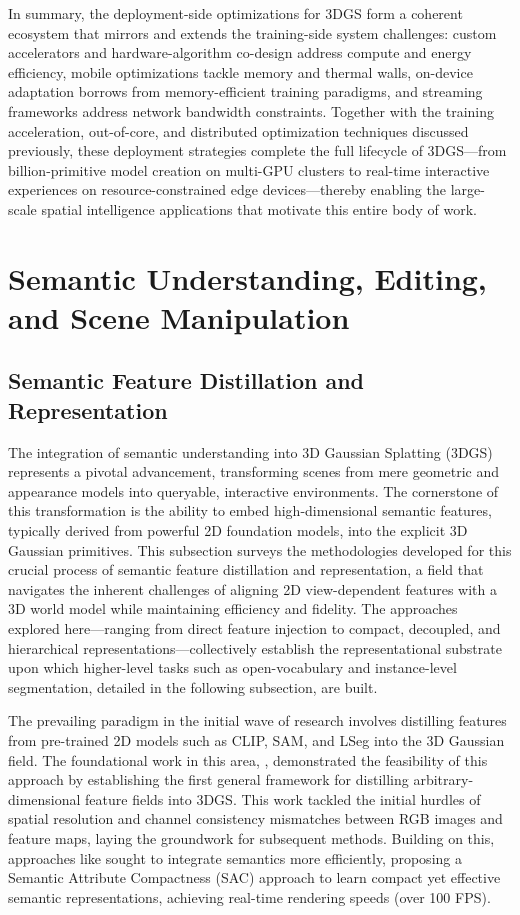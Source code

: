 \documentclass[11pt]{article}
\begin{document}
In summary, the deployment-side optimizations for 3DGS form a coherent ecosystem that mirrors and extends the training-side system challenges: custom accelerators and hardware-algorithm co-design address compute and energy efficiency, mobile optimizations tackle memory and thermal walls, on-device adaptation borrows from memory-efficient training paradigms, and streaming frameworks address network bandwidth constraints. Together with the training acceleration, out-of-core, and distributed optimization techniques discussed previously, these deployment strategies complete the full lifecycle of 3DGS---from billion-primitive model creation on multi-GPU clusters to real-time interactive experiences on resource-constrained edge devices---thereby enabling the large-scale spatial intelligence applications that motivate this entire body of work.

\section{Semantic Understanding, Editing, and Scene Manipulation}

\subsection{Semantic Feature Distillation and Representation}

The integration of semantic understanding into 3D Gaussian Splatting (3DGS) represents a pivotal advancement, transforming scenes from mere geometric and appearance models into queryable, interactive environments. The cornerstone of this transformation is the ability to embed high-dimensional semantic features, typically derived from powerful 2D foundation models, into the explicit 3D Gaussian primitives. This subsection surveys the methodologies developed for this crucial process of semantic feature distillation and representation, a field that navigates the inherent challenges of aligning 2D view-dependent features with a 3D world model while maintaining efficiency and fidelity. The approaches explored here---ranging from direct feature injection to compact, decoupled, and hierarchical representations---collectively establish the representational substrate upon which higher-level tasks such as open-vocabulary and instance-level segmentation, detailed in the following subsection, are built.

The prevailing paradigm in the initial wave of research involves distilling features from pre-trained 2D models such as CLIP, SAM, and LSeg into the 3D Gaussian field. The foundational work in this area, \cite{ref492}, demonstrated the feasibility of this approach by establishing the first general framework for distilling arbitrary-dimensional feature fields into 3DGS. This work tackled the initial hurdles of spatial resolution and channel consistency mismatches between RGB images and feature maps, laying the groundwork for subsequent methods. Building on this, approaches like \cite{ref493} sought to integrate semantics more efficiently, proposing a Semantic Attribute Compactness (SAC) approach to learn compact yet effective semantic representations, achieving real-time rendering speeds (over 100 FPS).
\end{document}
